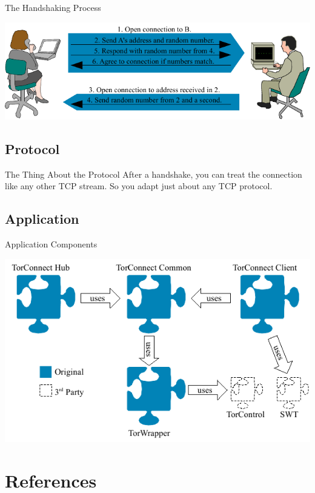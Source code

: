 \documentclass{beamer}
\begin{document}
\begin{frame}{The Handshaking Process}
\begin{center}
\includegraphics[width=.9\textwidth]{handshake.pdf}
\end{center}
\end{frame}

\subsection{Protocol}
\begin{frame}{The Thing About the Protocol}
After a handshake, you can treat the connection like any other TCP stream.  So you adapt just about any TCP protocol.
\end{frame}

\subsection{Application}
\begin{frame}{Application Components}
\begin{center}
\includegraphics[width=.9\textwidth]{architecture.pdf}
\end{center}
\end{frame}

\appendix
\section{References}
~\nocite{tor-design}


\end{document}
